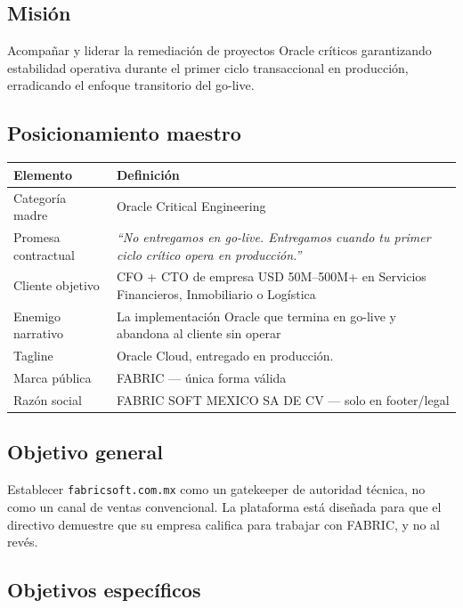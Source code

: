 \documentclass[11pt, a4paper]{article}
\begin{document}
\subsection{Misión}

Acompañar y liderar la remediación de proyectos Oracle críticos garantizando estabilidad
operativa durante el primer ciclo transaccional en producción, erradicando el enfoque
transitorio del go-live.

\subsection{Posicionamiento maestro}

\begin{table}[h]
\centering
\begin{tabularx}{\linewidth}{>{\ttfamily\color{textsec}\small}l X}
\toprule
Elemento & Definición \\
\midrule
Categoría madre   & Oracle Critical Engineering \\
Promesa contractual & \textit{``No entregamos en go-live. Entregamos cuando tu primer ciclo crítico opera en producción.''} \\
Cliente objetivo  & CFO + CTO de empresa USD 50M–500M+ en Servicios Financieros, Inmobiliario o Logística \\
Enemigo narrativo & La implementación Oracle que termina en go-live y abandona al cliente sin operar \\
Tagline           & Oracle Cloud, entregado en producción. \\
Marca pública     & FABRIC — única forma válida \\
Razón social      & FABRIC SOFT MEXICO SA DE CV — solo en footer/legal \\
\bottomrule
\end{tabularx}
\end{table}

\subsection{Objetivo general}

Establecer \texttt{fabricsoft.com.mx} como un gatekeeper de autoridad técnica, no como
un canal de ventas convencional. La plataforma está diseñada para que el directivo
demuestre que su empresa califica para trabajar con FABRIC, y no al revés.

\subsection{Objetivos específicos}
\end{document}
